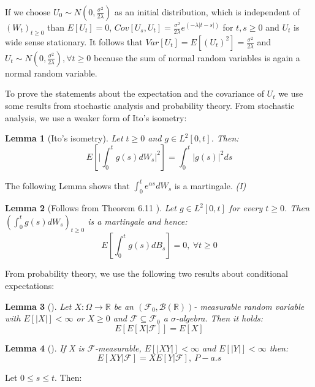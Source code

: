 \documentclass[%
thesis=student,%
coverpage=false,%
titlepage=false,%
headmarks=true, %
english,%
font=libertine, %
math=newpxtx, %
BCOR=5mm,%
coverBCOR=11mm%
]{tumbook}
\newtheorem{lemma}{Lemma}
\begin{document}
If we choose $U_{0} \sim N(0,\frac{\sigma^{2}}{2\lambda})$ as an initial distribution, which is independent of $(W_{t})_{t\geq 0}$ than $E[U_{t}] = 0$, $Cov[U_{s},U_{t}] = \frac{\sigma^2}{2\lambda}e^{(-\lambda\lvert t-s \rvert)}$ for $t,s \geq 0$ and $U_{t}$ is wide sense stationary. It follows that $Var[U_{t}]=E[(U_{t})^{2}]=\frac{\sigma^2}{2\lambda}$ and $U_{t} \sim N(0,\frac{\sigma^2}{2\lambda}), \forall t \geq 0$ because the sum of normal random variables is again a normal random variable.

To prove the statements about the expectation and the covariance of $U_{t}$ we use some results from stochastic analysis and probability theory.
From stochastic analysis, we use a weaker form of Ito's isometry:

\begin{lemma}[Ito's isometry]
 Let $t \geq 0$ and $g \in L^2[0,t]$. Then:
 \[
 E[\lvert\int_{0}^{t}g(s)dW_{s}\rvert^{2}] = \int_{0}^{t}\lvert g(s) \rvert ^2ds
 \]
\end{lemma}

The following Lemma shows that $\int_{0}^{t}e^{\alpha s}dW_{s}$ is a martingale.   \textit{(I)}

\begin{lemma}[Follows from Theorem 6.11 \cite{gantert:2024}]
    Let $g \in L^2[0,t]$ for every $t \geq 0$. Then $(\int_{0}^{t}g(s)dW_{s})_{t\geq 0}$ is a martingale and hence:
    \[
    E[\int_{0}^{t}g(s)dB_{s}] = 0, \ \forall t \geq 0
    \]
\end{lemma}

From probability theory, we use the following two results about conditional expectations:

\begin{lemma}[\cite{rolles:2023}]
    Let $X: \Omega \rightarrow \mathbb{R}$ be an $(\mathcal{F}_{0},\mathcal{B}(\mathbb{R}))$- measurable random variable with $E[\lvert X \rvert] < \infty$ or $X \geq 0$ and $\mathcal{F} \subseteq \mathcal{F}_{0}$ a $\sigma$-algebra. Then it holds:
    \[
    E[E[X|\mathcal{F}]] = E[X]
    \]
\end{lemma}

\begin{lemma}[\cite{rolles:2023}]
    If X is $\mathcal{F}$-measurable, $E[\lvert XY \rvert] < \infty$ and $E[\lvert Y \rvert]< \infty$ then:
    \[
    E[XY|\mathcal{F}] = XE[Y|\mathcal{F}], \ P-a.s
    \]
\end{lemma}

Let $0 \leq s \leq t$. Then:
\end{document}
